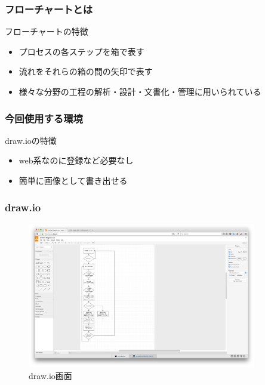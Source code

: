 \documentclass[10pt, dvipdfmx]{beamer}
\begin{document}
        \begin{frame}
        \end{frame}

        \begin{frame}
            \frametitle{フローチャートとは}
            \begin{block}{フローチャートの特徴}
                \begin{itemize}
                    \item プロセスの各ステップを箱で表す
                    \item 流れをそれらの箱の間の矢印で表す
                    \item 様々な分野の工程の解析・設計・文書化・管理に用いられている
                \end{itemize}
            \end{block}
        \end{frame}

        \begin{frame}
            \frametitle{今回使用する環境}
            \begin{block}{draw.ioの特徴}
                \begin{itemize}
                    \item web系なのに登録など必要なし
                    \item 簡単に画像として書き出せる
                \end{itemize}
            \end{block}
        \end{frame}

        \begin{frame}
            \frametitle{draw.io}
                \begin{figure}[htb]
                    \includegraphics[width=100mm]{images/drawIO.png}
                    \caption{draw.io画面}
                    \label{fig:04}
                \end{figure}
        \end{frame}
\end{document}
